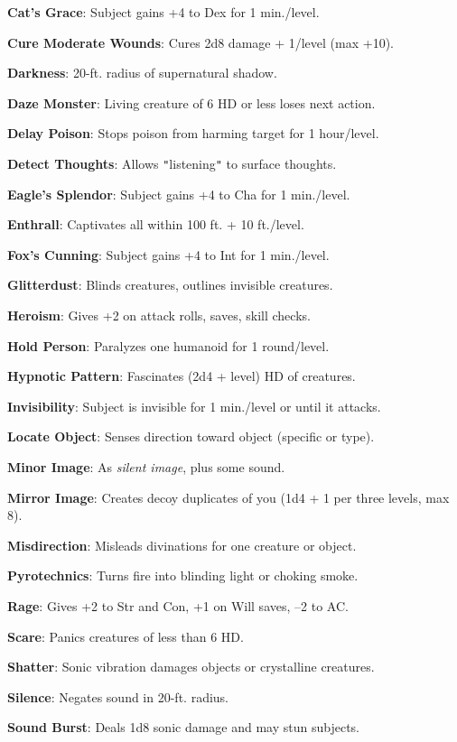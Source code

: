 \textbf{Cat's Grace}: Subject gains +4 to Dex for 1 min./level.

\textbf{Cure Moderate Wounds}: Cures 2d8 damage + 1/level (max +10).

\textbf{Darkness}: 20-ft. radius of supernatural shadow.

\textbf{Daze Monster}: Living creature of 6 HD or less loses next action.

\textbf{Delay Poison}: Stops poison from harming target for 1 hour/level.

\textbf{Detect Thoughts}: Allows \texttt{{}"{}}listening\texttt{{}"{}} to surface thoughts.

\textbf{Eagle's Splendor}: Subject gains +4 to Cha for 1 min./level.

\textbf{Enthrall}: Captivates all within 100 ft. + 10 ft./level.

\textbf{Fox's Cunning}: Subject gains +4 to Int for 1 min./level.

\textbf{Glitterdust}: Blinds creatures, outlines invisible creatures.

\textbf{Heroism}: Gives +2 on attack rolls, saves, skill checks.

\textbf{Hold Person}: Paralyzes one humanoid for 1 round/level.

\textbf{Hypnotic Pattern}: Fascinates (2d4 + level) HD of creatures.

\textbf{Invisibility}: Subject is invisible for 1 min./level or until it attacks.

\textbf{Locate Object}: Senses direction toward object (specific or type).

\textbf{Minor Image}: As \textit{silent image}, plus some sound.

\textbf{Mirror Image}: Creates decoy duplicates of you (1d4 + 1 per three levels, max 8).

\textbf{Misdirection}: Misleads divinations for one creature or object.

\textbf{Pyrotechnics}: Turns fire into blinding light or choking smoke.

\textbf{Rage}: Gives +2 to Str and Con, +1 on Will saves, --2 to AC.

\textbf{Scare}: Panics creatures of less than 6 HD.

\textbf{Shatter}: Sonic vibration damages objects or crystalline creatures.

\textbf{Silence}: Negates sound in 20-ft. radius.

\textbf{Sound Burst}: Deals 1d8 sonic damage and may stun subjects.


